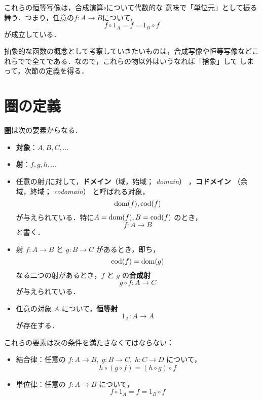 これらの恒等写像は，合成演算$\circ$について代数的な
意味で「単位元」として振る舞う．つまり，任意の$f: A \to B$について，
\[
 f \circ 1_A = f = 1_B \circ f
\]
が成立している．

\begin{center}
\end{center}

抽象的な函数の概念として考察していきたいものは，合成写像や恒等写像などこ
れらでで全てである．なので，これらの物以外はいうなれば「捨象」して
しまって，次節の定義を得る．

\section{圏の定義}
\begin{definition}
 {\bf 圏}は次の要素からなる．
 \begin{itemize}
  \item {\bfseries 対象}：$A,B,C,\ldots$
  \item {\bfseries 射}：$f,g,h,\ldots$
  \item 任意の射$f$に対して，{\bfseries ドメイン}（域，始域；{\itshape
	domain}）
	，{\bfseries コドメイン}
	（余域，終域；
	{\itshape codomain}）
	と呼ばれる対象，
	\[
	 \mathrm{dom}(f), \mathrm{cod}(f)
	\]
	が与えられている．特に$A = \mathrm{dom}(f), B = \mathrm{cod}(f)$ のとき，
	\[
	 f : A \to B
	\]
	と書く．
  \item 射 $f: A \to B$ と $g: B \to C$ があるとき，即ち，
	\[
	 \mathrm{cod}(f) = \mathrm{dom}(g)
	\]
	なる二つの射があるとき，$f$ と $g$ の{\bfseries 合成射}
	\[
	 g \circ f : A \to C
	\]
	が与えられている．
  \item 任意の対象 $A$ について，{\bfseries 恒等射}
	\[
	 1_A : A \to A
	\]
	が存在する．
 \end{itemize}
 
 これらの要素は次の条件を満たさなくてはならない：
 \begin{itemize}
  \item 結合律：任意の
	$f: A \to B,\; g: B \to C,\; h: C \to D$ について，
	\[
	 h \circ (g \circ f) = (h \circ g) \circ f
	\]
  \item 単位律：任意の $f : A \to B$ について，
	\[
	 f \circ 1_A = f = 1_B \circ f
	\]
 \end{itemize}
\end{definition}

